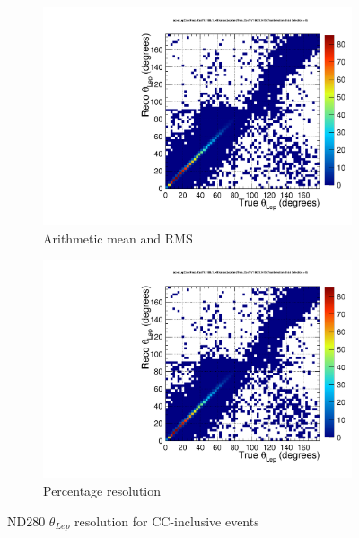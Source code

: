 \begin{figure}[h]
	\begin{subfigure}[t]{0.49\textwidth}
		\includegraphics[width=\textwidth, trim={0mm 0mm 0mm 0mm}, clip,page=2]{figures/det/resolution/LepCandTrue_And_Reco_Th_FullRange_ForJacob}
		\caption{Arithmetic mean and RMS}
	\end{subfigure}
	\begin{subfigure}[t]{0.49\textwidth}
		\includegraphics[width=\textwidth, trim={0mm 0mm 0mm 0mm}, clip,page=3]{figures/det/resolution/LepCandTrue_And_Reco_Th_FullRange_ForJacob}
		\caption{Percentage resolution}
	\end{subfigure}
	
	\caption{ND280 $\theta_{Lep}$ resolution for CC-inclusive events}
	\label{fig:detector_resolution_thetamu}
\end{figure}